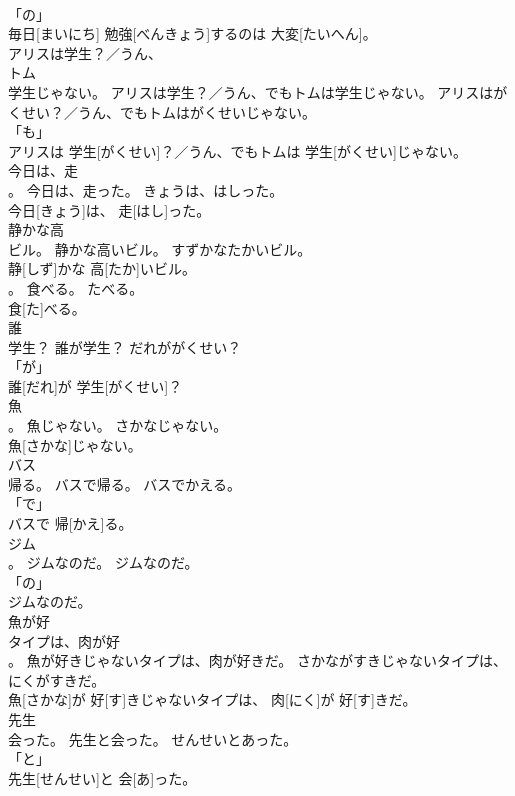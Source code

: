 \documentclass[8pt]{extreport}
\begin{document}
\begin{CJK}{UTF8}{min}
\\	「の」 
\\	毎日[まいにち] 勉強[べんきょう]するのは 大変[たいへん]。		
\\	アリスは学生？／うん、
\\	トム
\\	学生じゃない。	アリスは学生？／うん、でもトムは学生じゃない。	アリスはがくせい？／うん、でもトムはがくせいじゃない。	
\\	「も」 
\\	アリスは 学生[がくせい]？／うん、でもトムは 学生[がくせい]じゃない。		
\\	今日は、走
\\	。	今日は、走った。	きょうは、はしった。	
\\	今日[きょう]は、 走[はし]った。		
\\	静かな高
\\	ビル。	静かな高いビル。	すずかなたかいビル。	
\\	静[しず]かな 高[たか]いビル。		
\\	。	食べる。	たべる。	
\\	食[た]べる。		
\\	誰
\\	学生？	誰が学生？	だれががくせい？	
\\	「が」 
\\	誰[だれ]が 学生[がくせい]？		
\\	魚
\\	。	魚じゃない。	さかなじゃない。	
\\	魚[さかな]じゃない。		
\\	バス
\\	帰る。	バスで帰る。	バスでかえる。	
\\	「で」 
\\	バスで 帰[かえ]る。		
\\	ジム
\\	。	ジムなのだ。	ジムなのだ。	
\\	「の」 
\\	ジムなのだ。		
\\	魚が好
\\	タイプは、肉が好
\\	。	魚が好きじゃないタイプは、肉が好きだ。	さかながすきじゃないタイプは、にくがすきだ。	
\\	魚[さかな]が 好[す]きじゃないタイプは、 肉[にく]が 好[す]きだ。		
\\	先生
\\	会った。	先生と会った。	せんせいとあった。	
\\	「と」 
\\	先生[せんせい]と 会[あ]った。		

\end{CJK}
\end{document}
